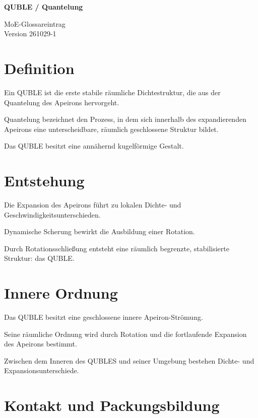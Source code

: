 \documentclass[11pt,a4paper]{article}
\begin{document}
\vspace*{-1.8cm}

\noindent
\begin{minipage}[t]{0.66\textwidth}
{\LARGE\bfseries QUBLE / Quantelung}
\end{minipage}
\hfill
\begin{minipage}[t]{0.30\textwidth}
\raggedleft
{\small MoE-Glossareintrag}\\
{\small Version 261029-1}
\end{minipage}

\vspace{1.4em}

\section*{Definition}

Ein QUBLE ist die erste stabile räumliche
Dichtestruktur, die aus der Quantelung
des Apeirons hervorgeht.

Quantelung bezeichnet den Prozess,
in dem sich innerhalb des expandierenden
Apeirons eine unterscheidbare,
räumlich geschlossene Struktur bildet.

Das QUBLE besitzt eine annähernd
kugelförmige Gestalt.

\section*{Entstehung}

Die Expansion des Apeirons führt
zu lokalen Dichte- und
Geschwindigkeitsunterschieden.

Dynamische Scherung bewirkt
die Ausbildung einer Rotation.

Durch Rotationsschließung entsteht
eine räumlich begrenzte,
stabilisierte Struktur: das QUBLE.

\section*{Innere Ordnung}

Das QUBLE besitzt eine geschlossene
innere Apeiron-Strömung.

Seine räumliche Ordnung wird
durch Rotation und die fortlaufende
Expansion des Apeirons bestimmt.

Zwischen dem Inneren des QUBLES
und seiner Umgebung bestehen
Dichte- und Expansionsunterschiede.

\section*{Kontakt und Packungsbildung}
\end{document}
